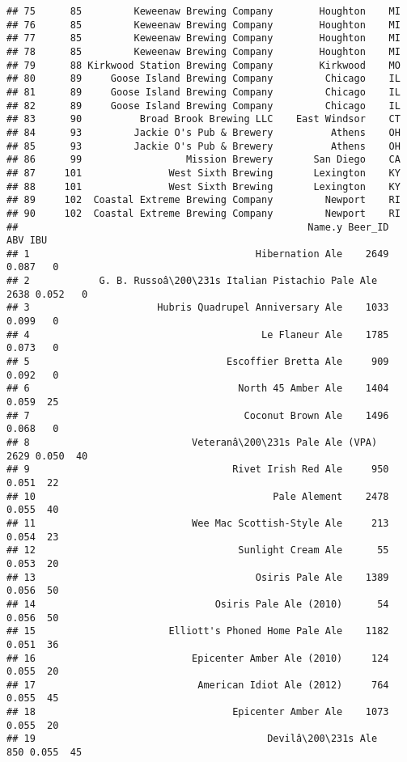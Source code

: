 \documentclass[
]{article}
\begin{document}
\begin{verbatim}
## 75      85         Keweenaw Brewing Company        Houghton    MI
## 76      85         Keweenaw Brewing Company        Houghton    MI
## 77      85         Keweenaw Brewing Company        Houghton    MI
## 78      85         Keweenaw Brewing Company        Houghton    MI
## 79      88 Kirkwood Station Brewing Company        Kirkwood    MO
## 80      89     Goose Island Brewing Company         Chicago    IL
## 81      89     Goose Island Brewing Company         Chicago    IL
## 82      89     Goose Island Brewing Company         Chicago    IL
## 83      90          Broad Brook Brewing LLC    East Windsor    CT
## 84      93         Jackie O's Pub & Brewery          Athens    OH
## 85      93         Jackie O's Pub & Brewery          Athens    OH
## 86      99                  Mission Brewery       San Diego    CA
## 87     101               West Sixth Brewing       Lexington    KY
## 88     101               West Sixth Brewing       Lexington    KY
## 89     102  Coastal Extreme Brewing Company         Newport    RI
## 90     102  Coastal Extreme Brewing Company         Newport    RI
##                                                  Name.y Beer_ID   ABV IBU
## 1                                       Hibernation Ale    2649 0.087   0
## 2            G. B. Russoâ\200\231s Italian Pistachio Pale Ale    2638 0.052   0
## 3                      Hubris Quadrupel Anniversary Ale    1033 0.099   0
## 4                                        Le Flaneur Ale    1785 0.073   0
## 5                                  Escoffier Bretta Ale     909 0.092   0
## 6                                    North 45 Amber Ale    1404 0.059  25
## 7                                     Coconut Brown Ale    1496 0.068   0
## 8                            Veteranâ\200\231s Pale Ale (VPA)    2629 0.050  40
## 9                                   Rivet Irish Red Ale     950 0.051  22
## 10                                         Pale Alement    2478 0.055  40
## 11                           Wee Mac Scottish-Style Ale     213 0.054  23
## 12                                   Sunlight Cream Ale      55 0.053  20
## 13                                      Osiris Pale Ale    1389 0.056  50
## 14                               Osiris Pale Ale (2010)      54 0.056  50
## 15                       Elliott's Phoned Home Pale Ale    1182 0.051  36
## 16                           Epicenter Amber Ale (2010)     124 0.055  20
## 17                            American Idiot Ale (2012)     764 0.055  45
## 18                                  Epicenter Amber Ale    1073 0.055  20
## 19                                        Devilâ\200\231s Ale     850 0.055  45

\end{verbatim}
\end{document}
